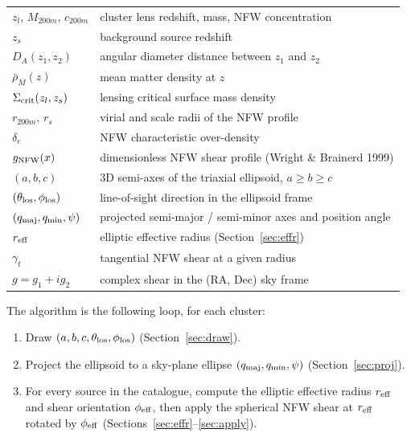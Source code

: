 \documentclass[11pt,a4paper]{article}
\newcommand{\Reff}{r_{\rm eff}}
\begin{document}
\begin{tabular}{ll}
$z_l$, $M_{200m}$, $c_{200m}$    & cluster lens redshift, mass, NFW concentration \\
$z_s$                            & background source redshift \\
$D_A(z_1, z_2)$                  & angular diameter distance between $z_1$ and $z_2$ \\
$\bar{\rho}_M(z)$                & mean matter density at $z$ \\
$\Sigma_{\rm crit}(z_l, z_s)$    & lensing critical surface mass density \\
$r_{200m}$, $r_s$                & virial and scale radii of the NFW profile \\
$\delta_c$                       & NFW characteristic over-density \\
$g_{\rm NFW}(x)$                 & dimensionless NFW shear profile (Wright \& Brainerd 1999) \\
$(a, b, c)$                      & 3D semi-axes of the triaxial ellipsoid, $a \ge b \ge c$ \\
$(\theta_{\rm los}, \phi_{\rm los})$ & line-of-sight direction in the ellipsoid frame \\
$(q_{\rm maj}, q_{\rm min}, \psi)$ & projected semi-major / semi-minor axes
                                     and position angle \\
$\Reff$                          & elliptic effective radius (Section~\ref{sec:effr}) \\
$\gamma_t$                       & tangential NFW shear at a given radius \\
$g = g_1 + i g_2$                & complex shear in the (RA, Dec) sky frame \\
\end{tabular}

\bigskip

The algorithm is the following loop, for each cluster:
\begin{enumerate}
\item Draw $(a, b, c, \theta_{\rm los}, \phi_{\rm los})$
      (Section~\ref{sec:draw}).
\item Project the ellipsoid to a sky-plane ellipse
      $(q_{\rm maj}, q_{\rm min}, \psi)$
      (Section~\ref{sec:proj}).
\item For every source in the catalogue, compute the elliptic
      effective radius $\Reff$ and shear orientation $\phi_{\rm eff}$,
      then apply the spherical NFW shear at $\Reff$ rotated by $\phi_{\rm eff}$
      (Sections~\ref{sec:effr}--\ref{sec:apply}).
\end{enumerate}
\end{document}
